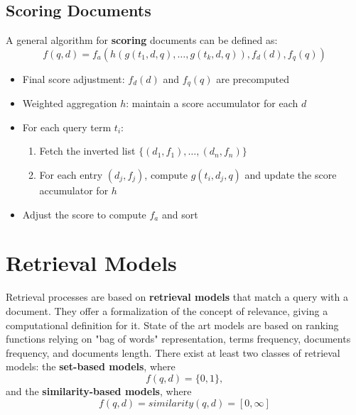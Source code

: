 \documentclass{article}
\begin{document}
\subsection{Scoring Documents}
A general algorithm for \textbf{scoring} documents can be defined as:
\[
    f(q,d) = f_a(h(g(t_1,d,q), \dots, g(t_k,d,q)), f_d(d), f_q(q))
\]
\begin{itemize}
    \item Final score adjustment: $f_d(d)$ and $f_q(q)$ are precomputed
    \item Weighted aggregation $h$: maintain a score accumulator for each $d$
    \item For each query term $t_i$:
        \begin{enumerate}
            \item Fetch the inverted list $\{(d_1,f_1), \dots, (d_n,f_n)\}$
            \item For each entry $(d_j,f_j)$, compute $g(t_i, d_j, q)$ and update the score accumulator for $h$
        \end{enumerate}
    \item Adjust the score to compute $f_a$ and sort
\end{itemize}

\section{Retrieval Models}
Retrieval processes are based on \textbf{retrieval models} that match a query with a document. They offer a formalization of the concept of relevance, giving a computational definition for it. State of the art models are based on ranking functions relying on "bag of words" representation, terms frequency, documents frequency, and documents length.
There exist at least two classes of retrieval models: the \textbf{set-based models}, where
\[
    f(q,d) = \{0,1\},
\]
and the \textbf{similarity-based models}, where
\[
    f(q,d) = similarity(q,d) = [0,\infty]
\]
\end{document}
